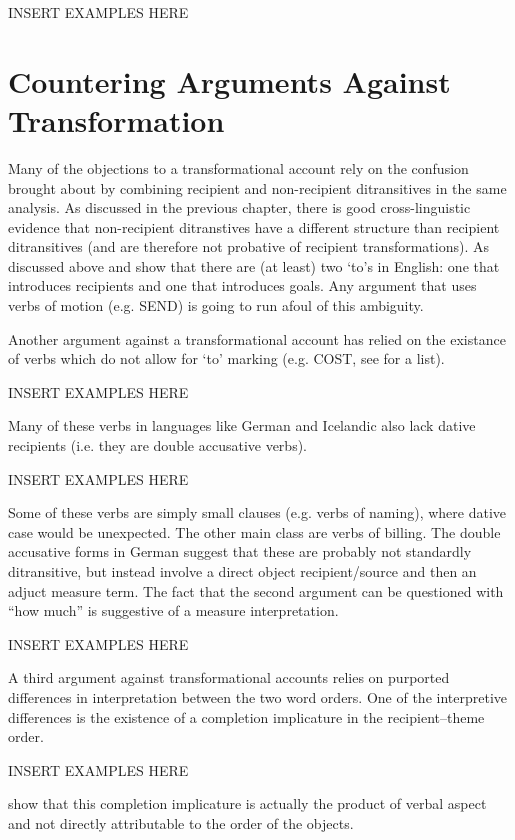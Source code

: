 \documentclass[11pt]{upenndiss}
\begin{document}
INSERT EXAMPLES HERE

\section{Countering Arguments Against Transformation}

Many of the objections to a transformational account rely on the confusion brought about by combining recipient and non-recipient ditransitives in the same analysis. As discussed in the previous chapter, there is good cross-linguistic evidence that non-recipient ditranstives have a different structure than recipient ditransitives (and are therefore not probative of recipient transformations). As discussed above \cite{Levinson.2005} and \cite{Hovav.2008} show that there are (at least) two `to's in English: one that introduces recipients and one that introduces goals. Any argument that uses verbs of motion (e.g. SEND) is going to run afoul of this ambiguity.

Another argument against a transformational account has relied on the existance of verbs which do not allow for `to' marking (e.g. COST, see \citet{Levin.1993} for a list).

INSERT EXAMPLES HERE

Many of these verbs in languages like German and Icelandic also lack dative recipients (i.e. they are double accusative verbs). 

INSERT EXAMPLES HERE

Some of these verbs are simply small clauses (e.g. verbs of naming), where dative case would be unexpected. The other main class are verbs of billing. The double accusative forms in German suggest that these are probably not standardly ditransitive, but instead involve a direct object recipient/source and then an adjuct measure term. The fact that the second argument can be questioned with ``how much'' is suggestive of a measure interpretation.

INSERT EXAMPLES HERE

A third argument against transformational accounts relies on purported differences in interpretation between the two word orders. One of the interpretive differences is the existence of a completion implicature in the recipient--theme order.

INSERT EXAMPLES HERE

\cite{Hovav.2008} show that this completion implicature is actually the product of verbal aspect and not directly attributable to the order of the objects.
\end{document}
